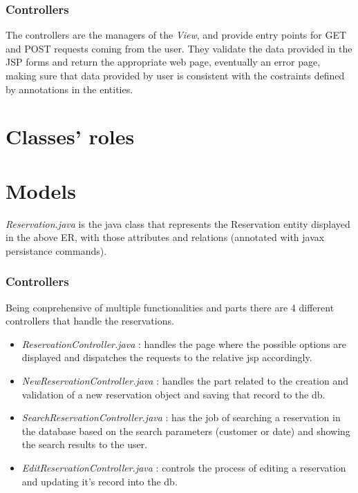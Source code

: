 \documentclass{article}
\begin{document}
\subsubsection*{Controllers}
The controllers are the managers of the \textit{View}, and provide entry points for GET and POST requests coming from the user. They validate the data provided in the JSP forms and return the appropriate web page, eventually an error page, making sure that data provided by user is consistent with the costraints defined by annotations in the entities. 

\vspace{10mm}
\section*{Classes' roles}

\section*{Models}
\textit{Reservation.java} is the java class that represents
the Reservation entity displayed in the above ER, with those attributes and relations
 (annotated with javax persistance commands).

\subsubsection*{Controllers}
Being conprehensive of multiple functionalities and parts there are 4 different
controllers that handle the reservations.

\begin{itemize}
	\item \textit{ReservationController.java} : handles the page where the possible
	options are displayed and dispatches the requests to the relative jsp accordingly.
	
	\item \textit{NewReservationController.java} : handles the part related to the 
		creation and validation of a new reservation object and saving that
		 record to the db.
		
	\item \textit{SearchReservationController.java} : has the job of searching a
	reservation in the database based on the search parameters (customer or date) and
	showing the search results to the user.
	
	\item \textit{EditReservationController.java} : controls the process of editing 
	a reservation and updating it's record into the db.

\end{itemize}
\end{document}

